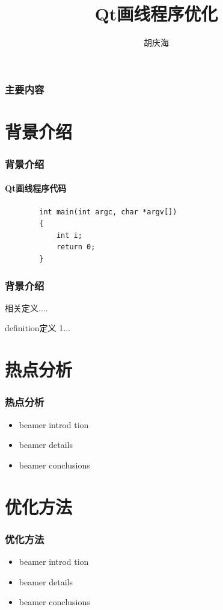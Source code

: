 \documentclass{beamer}
\begin{document}
\begin{CJK}{UTF8}{gbsn}     %

	\title{Qt画线程序优化}
	\author{胡庆海}
	\date{}

    \begin{frame} %
        \titlepage    %
    \end{frame}


    \begin{frame}
        \frametitle{主要内容}
        \tableofcontents
    \end{frame}

	\section{背景介绍}
	\begin{frame}[fragile]
        \frametitle{背景介绍}
		\framesubtitle{Qt画线程序代码}  

		\begin{lstlisting}
		int main(int argc, char *argv[])
		{
			int i;
		   	return 0;
		}
		\end{lstlisting}

	\end{frame}

    \begin{frame}
        \frametitle{背景介绍}
        \pause
        相关定义....
        \begin{definition}
            definition定义 1...
        \end{definition}
    \end{frame}

	\section{热点分析}
    \begin{frame}
        \frametitle{热点分析}\pause
        \begin{itemize}
         \item beamer introd tion \pause
         \item beamer details \pause
         \item beamer conclusions
        \end{itemize}
    \end{frame}

	\section{优化方法}
    \begin{frame}
        \frametitle{优化方法}\pause
        \begin{itemize}
         \item beamer introd tion \pause
         \item beamer details \pause
         \item beamer conclusions
        \end{itemize}
    \end{frame}


\end{CJK}
\end{document}
